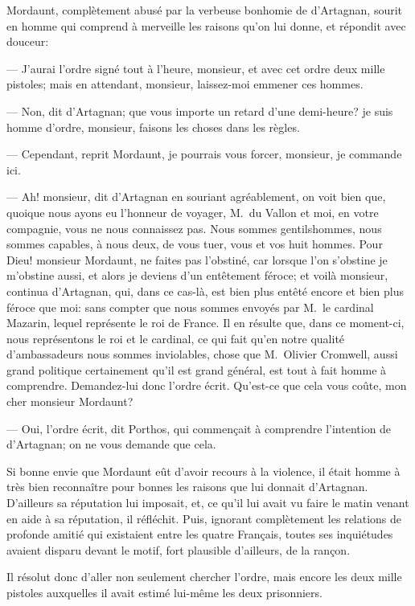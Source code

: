Mordaunt, complètement abusé par la verbeuse bonhomie de d'Artagnan, sourit en homme qui comprend à merveille les raisons qu'on lui donne, et répondit avec douceur:

— J'aurai l'ordre signé tout à l'heure, monsieur, et avec cet ordre deux mille pistoles; mais en attendant, monsieur, laissez-moi emmener ces hommes.

— Non, dit d'Artagnan; que vous importe un retard d'une demi-heure? je suis homme d'ordre, monsieur, faisons les choses dans les règles.

— Cependant, reprit Mordaunt, je pourrais vous forcer, monsieur, je commande ici.

— Ah! monsieur, dit d'Artagnan en souriant agréablement, on voit bien que, quoique nous ayons eu l'honneur de voyager, M.~du Vallon et moi, en votre compagnie, vous ne nous connaissez pas. Nous sommes gentilshommes, nous sommes capables, à nous deux, de vous tuer, vous et vos huit hommes. Pour Dieu! monsieur Mordaunt, ne faites pas l'obstiné, car lorsque l'on s'obstine je m'obstine aussi, et alors je deviens d'un entêtement féroce; et voilà monsieur, continua d'Artagnan, qui, dans ce cas-là, est bien plus entêté encore et bien plus féroce que moi: sans compter que nous sommes envoyés par M.~le cardinal Mazarin, lequel représente le roi de France. Il en résulte que, dans ce moment-ci, nous représentons le roi et le cardinal, ce qui fait qu'en notre qualité d'ambassadeurs nous sommes inviolables, chose que M.~Olivier Cromwell, aussi grand politique certainement qu'il est grand général, est tout à fait homme à comprendre. Demandez-lui donc l'ordre écrit. Qu'est-ce que cela vous coûte, mon cher monsieur Mordaunt?

— Oui, l'ordre écrit, dit Porthos, qui commençait à comprendre l'intention de d'Artagnan; on ne vous demande que cela.

Si bonne envie que Mordaunt eût d'avoir recours à la violence, il était homme à très bien reconnaître pour bonnes les raisons que lui donnait d'Artagnan. D'ailleurs sa réputation lui imposait, et, ce qu'il lui avait vu faire le matin venant en aide à sa réputation, il réfléchit. Puis, ignorant complètement les relations de profonde amitié qui existaient entre les quatre Français, toutes ses inquiétudes avaient disparu devant le motif, fort plausible d'ailleurs, de la rançon.

Il résolut donc d'aller non seulement chercher l'ordre, mais encore les deux mille pistoles auxquelles il avait estimé lui-même les deux prisonniers.

